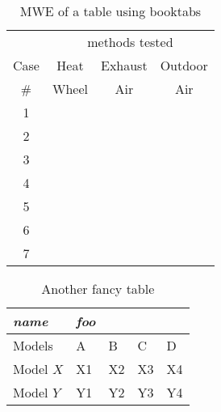 \documentclass{article}
\newcommand*\CHECK{\ding{51}}
\begin{document}
\begin{table}
    \centering
    \caption{MWE of a table using booktabs}
    \begin{tabular}{*4c}
        \toprule
        & \multicolumn{3}{c}{methods tested} \\
        \cmidrule(lr){2-4}
        Case & Heat  & Exhaust & Outdoor \\    
        \#   & Wheel & Air     & Air     \\
        \midrule
        1 &        & \CHECK &        \\
        2 &        &        & \CHECK \\
        3 &        & \CHECK & \CHECK \\
        4 & \CHECK &        &        \\
        5 & \CHECK & \CHECK &        \\
        6 & \CHECK &        & \CHECK \\
        7 & \CHECK & \CHECK & \CHECK \\
        \bottomrule
    \end{tabular}
\end{table}
\medskip

\begin{table}
    \centering
    \caption{Another fancy table}
    \begin{tabular}{*5l}
        \toprule
        \emph{name} & \emph{foo} &&&  \\
        \midrule
        \rowcolor{Lavender}
        Models    & A  & B  & C  & D  \\ 
        \rowcolor{PeachPuff}
        Model $X$ & X1 & X2 & X3 & X4\\ 
        \rowcolor{VioletRed}
        Model $Y$ & Y1 & Y2 & Y3 & Y4\\
        \bottomrule
        \hline
    \end{tabular}
\end{table}
\end{document}
